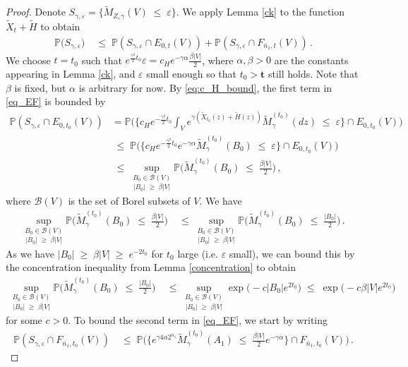 \documentclass[11pt]{article}
\numberwithin{equation}{section}
\theoremstyle{definition}
\renewcommand{\tilde}{\widetilde}          %
\renewcommand{\leq}{\;\leqslant\;}                   %
\renewcommand{\geq}{\;\geqslant\;}                   %
\renewcommand{\P}{\mathbb{P}}
\def\eps{\varepsilon}
\newcommand{\ab}{|}
\newcommand{\grea}{>}
\newcommand{\sd}{S_{\gamma,\eps}}
\newcommand{\Pb}{\P}
\begin{document}
\begin{proof}
Denote $\sd = \{ \tilde M_{Z,\gamma}(V) \leq \eps \}$. We apply Lemma \ref{ck} to the function $\tilde X_{t} + \tilde H$ to obtain
\begin{align}\label{eq_EF}
\Pb \big( \sd \big) &\leq  \Pb( \sd \cap E_{0,t}(V) ) + \Pb(\sd \cap F_{\bar n_1, t}(V) )\,.
\end{align}
We choose $t = t_0$ such that $e^{\frac{\gamma^2}{2} t_0} \eps = c_H e^{-\gamma \alpha} \tfrac{ \beta |V|}{2} $, where $\alpha, \beta \grea 0$ are the constants appearing in Lemma \ref{ck}, and $\eps$ small enough so that $t_0 > \mathbf{t}$ still holds. Note that $\beta$ is fixed, but $\alpha$ is arbitrary for now. By \eqref{eq:c_H_bound}, the first term in \eqref{eq_EF} is bounded by
\begin{align*}
\Pb( \sd \cap E_{0,t_0}(V) )  &= \Pb \big( \big\{ c_H e^{- \frac{\gamma^2}{2} t_0} \int_V e^{\gamma (\tilde X_{t_0}(z) + \tilde H(z))}  \tilde M^{(t_0)}_\gamma(dz) \leq \eps \big \} \cap E_{0,t_0}(V)  \big) \\
& \leq \Pb \big( \big\{ c_H e^{- \frac{\gamma^2}{2} t_0} e^{- \gamma \alpha} \tilde M_\gamma^{(t_0)}(B_0) \leq \eps \big \} \cap E_{0,t_0}(V)  \big) \\
&\leq \underset{|B_0| \geq \beta |V|}{\sup_{B_0 \in \mathcal{B}(V)}} \Pb \big( \tilde M_\gamma^{(t_0)}(B_0) \leq \tfrac{\beta \ab V \ab}{2} \big)\,,
\end{align*}
where $\mathcal{B}(V)$ is the set of Borel subsets of $V$. We have
\begin{align*}
\underset{|B_0| \geq \beta |V|}{\sup_{B_0 \in \mathcal{B}(V)}} \Pb \big( \tilde M_\gamma^{(t_0)}(B_0) \leq \tfrac{\beta \ab V \ab}{2} \big) & \leq \underset{|B_0| \geq \beta |V|}{\sup_{B_0 \in \mathcal{B}(V)}} \Pb \big( \tilde M_\gamma^{(t_0)}(B_0) \leq \tfrac{|B_0|}{2} \big)\,.
\end{align*}
As we have $|B_0| \geq \beta |V| \geq e^{-2t_0}$ for $t_0$ large (i.e. $\eps$ small), we can bound this by the concentration inequality from Lemma \ref{concentration} to obtain
\begin{align*}
\underset{|B_0| \geq \beta |V|}{\sup_{B_0 \in \mathcal{B}(V)}} \Pb \big( \tilde M_\gamma^{(t_0)}(B_0) \leq \tfrac{|B_0|}{2} \big) & \leq \underset{|B_0| \geq \beta |V|}{\sup_{B_0 \in \mathcal{B}(V)}} \exp \big( -c |B_0| e^{2t_0} \big) \leq \exp \big( - c \beta |V| e^{2t_0} \big)
\end{align*}
for some $c \grea 0$. To bound the second term in \eqref{eq_EF}, we start by writing
\begin{align*}
\Pb(\sd \cap F_{\bar n_1, t_0}(V) ) &\leq \Pb \big( \big\{  e^{\gamma 4 \alpha 2^{n_1}} \tilde M_\gamma^{(t_0)}(A_1) \leq \tfrac{\beta |V|}{2}  e^{-\gamma \alpha} \big\} \cap F_{\bar n_1, t_0}(V) \big)\,.

\end{align*}
\end{proof}
\end{document}
